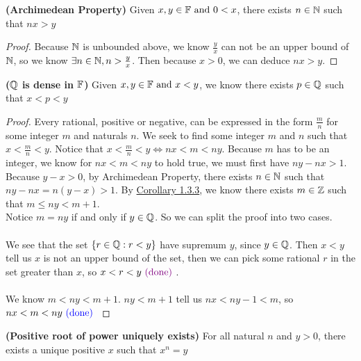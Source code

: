 \documentclass{report}
\begin{document}
\begin{theorem}
\textbf{(Archimedean Property)} Given $x,y\in\mathbb{F}\text{ and }0<x$, there exists $n\in\mathbb{N}$ such that $nx>y$ 
\end{theorem}
\begin{proof}
 Because $\mathbb{N}$ is unbounded above, we know  $\frac{y}{x}$ can not be an upper bound of $\mathbb{N}$, so we know  $\exists n\in\mathbb{N},n>\frac{y}{x} $. Then because $x>0$, we can deduce $nx>y$.
\end{proof}
\begin{theorem}
\textbf{($\mathbb{Q}$ is dense in $\mathbb{F}$)} Given $x,y\in\mathbb{F}\text{ and }x<y$, we know there exists $p \in\mathbb{Q}$ such that $x<p<y$
\end{theorem}
\begin{proof}
Every rational, positive or negative, can be expressed in the form $\frac{m}{n}$ for some integer $m$ and naturals $n$. We seek to find some integer $m$ and $n$ such that $x<\frac{m}{n}<y$. Notice that $x<\frac{m}{n}<y\iff nx<m<ny$. Because $m$ has to be an integer, we know for $nx<m<ny$ to hold true, we must first have $ny-nx>1$. Because $y-x>0$, by Archimedean Property, there exists $n\in\mathbb{N}$ such that $ny-nx=n(y-x)>1$. By \hyperref[1.3.3]{Corollary 1.3.3}, we know there exists $m \in\mathbb{Z}$ such that $m\leq  ny<m+1$.\\

Notice $m=ny$ if and only if $ y\in\mathbb{Q}$. So we can split the proof into two cases.\\

\\

We see that the set $\{ r\in\mathbb{Q}:r<y \}$ have supremum $y$, since $y\in\mathbb{Q}$. Then $x<y$ tell us $x$ is not an upper bound of the set, then we can pick some rational $r$ in the set greater than $x$, so $x<r<y\textcolor{violet}{\text{ (done) }}$.\\

\\ 

We know $m<ny<m+1$. $ny<m+1$ tell us $nx<ny-1<m$, so $nx<m<ny\textcolor{blue}{\text{ (done) }}$ 
\end{proof}
\begin{theorem}
    \label{1.3.6} 
\textbf{(Positive root of power uniquely exists)} For all natural $n$ and $y>0$, there exists a unique positive $x$ such that $x^n=y$
\end{theorem}
\end{document}
